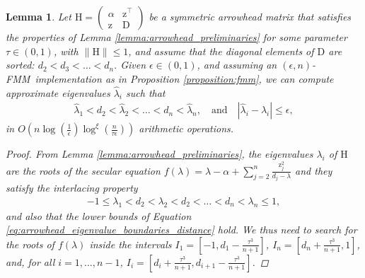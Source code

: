 \documentclass{article}
\newcommand{\lpar}{\left(}
\newcommand{\rpar}{\right)}
\newtheorem{lemma}{Lemma}[section]
\newcommand\vecz{\boldsymbol{\mathrm{z}}}
\newcommand\matD{\boldsymbol{\mathrm{D}}}
\newcommand\matH{\boldsymbol{\mathrm{H}}}
\newcommand{\cfmm}{\xi}
\newcommand{\fmmalgo}{FMM} \usepackage[utf8]{inputenc}
\begin{document}
\begin{lemma}
    \label{lemma:fmm_approximate_eigenvalues}
    Let $\matH=\begin{pmatrix}
        \alpha & \vecz^\top\\
        \vecz & \matD
    \end{pmatrix}
    $
    be a symmetric arrowhead matrix 
    that satisfies the properties of Lemma \ref{lemma:arrowhead_preliminaries} for some parameter $\tau\in(0,1)$,
    with $\|\matH\|\leq 1$, 
    and assume that the diagonal elements of $\matD$ are sorted:
    $
        d_2 < d_3 <\ldots < d_n.
    $ 
    Given $\epsilon\in(0,1)$, and assuming an $(\epsilon,n)$-\fmmalgo\   implementation as in Proposition \ref{proposition:fmm}, we can compute approximate eigenvalues $\widehat\lambda_i$ such that
    \begin{align*}
        \widehat\lambda_1< d_2 < \widehat\lambda_2 < \ldots <d_n < \widehat\lambda_n, 
        \quad \text{and} \quad
        |\widehat\lambda_i -\lambda_i| \leq \epsilon,
    \end{align*}
    in $O\lpar
        n\log(\tfrac{1}{\epsilon})\log^{\cfmm}(\frac{n}{\tau\epsilon})
    \rpar$ arithmetic operations.
    \begin{proof}
        From Lemma \ref{lemma:arrowhead_preliminaries}, the eigenvalues $\lambda_i$ of $\matH$ are the roots of the secular equation $f(\lambda)=\lambda-\alpha+\sum_{j=2}^n \tfrac{\vecz_j^2}{d_j-\lambda}$ and they satisfy the interlacing property 
        \begin{align*}
            -1 \leq \lambda_1 < d_2 < \lambda_2 < d_2 <\ldots < d_n < \lambda_n \leq 1,
        \end{align*}
        and also that the lower bounds of Equation \eqref{eq:arrowhead_eigenvalue_boundaries_distance} hold.
        We thus need to search for the roots of $f(\lambda)$ inside the intervals $
        I_1=[-1,d_1-\tfrac{\tau^3}{n+1}]
        $, 
        $
        I_n=[d_n+\tfrac{\tau^3}{n+1},1]
        $, and, for all $i=1,\ldots, n-1$, $
        I_i=[d_i+\tfrac{\tau^3}{n+1},d_{i+1}-\tfrac{\tau^3}{n+1}]
        $. 
        

\end{proof}
\end{lemma}
\end{document}
